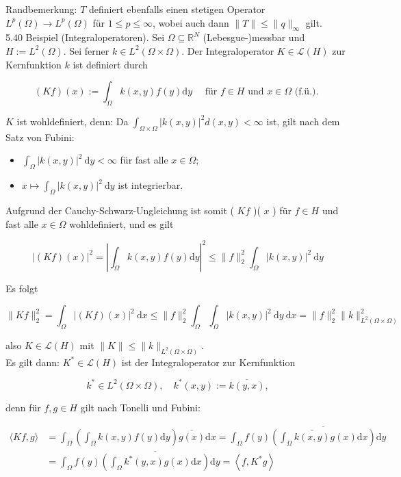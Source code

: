 \documentclass[10pt, letterpaper]{article}
\begin{document}
Randbemerkung: $T$ definiert ebenfalls einen stetigen Operator $L^{p}(\Omega) \rightarrow L^{p}(\Omega)$ für $1 \leq p \leq \infty$, wobei auch dann $\|T\| \leq\|q\|_{\infty}$ gilt.\\
5.40 Beispiel (Integraloperatoren). Sei $\Omega \subseteq \mathbb{R}^{N}$ (Lebesgue-)messbar und $H:=L^{2}(\Omega)$. Sei ferner $k \in L^{2}(\Omega \times \Omega)$. Der Integraloperator $K \in \mathcal{L}(H)$ zur Kernfunktion $k$ ist definiert durch

$$
(K f)(x):=\int_{\Omega} k(x, y) f(y) \mathrm{d} y \quad \text { für } f \in H \text { und } x \in \Omega \text { (f.ü.). }
$$

$K$ ist wohldefiniert, denn: Da $\int_{\Omega \times \Omega}|k(x, y)|^{2} d(x, y)<\infty$ ist, gilt nach dem Satz von Fubini:

\begin{itemize}
  \item $\int_{\Omega}|k(x, y)|^{2} \mathrm{~d} y<\infty$ für fast alle $x \in \Omega$;
  \item $x \mapsto \int_{\Omega}|k(x, y)|^{2} \mathrm{~d} y$ ist integrierbar.
\end{itemize}

Aufgrund der Cauchy-Schwarz-Ungleichung ist somit ( $K f$ )( $x$ ) für $f \in H$ und fast alle $x \in \Omega$ wohldefiniert, und es gilt

$$
|(K f)(x)|^{2}=\left|\int_{\Omega} k(x, y) f(y) \mathrm{d} y\right|^{2} \leq\|f\|_{2}^{2} \int_{\Omega}|k(x, y)|^{2} \mathrm{~d} y
$$

Es folgt

$$
\|K f\|_{2}^{2}=\int_{\Omega}|(K f)(x)|^{2} \mathrm{~d} x \leq\|f\|_{2}^{2} \int_{\Omega} \int_{\Omega}|k(x, y)|^{2} \mathrm{~d} y \mathrm{~d} x=\|f\|_{2}^{2}\|k\|_{L^{2}(\Omega \times \Omega)}^{2}
$$

also $K \in \mathcal{L}(H)$ mit $\|K\| \leq\|k\|_{L^{2}(\Omega \times \Omega)}$.\\
Es gilt dann: $K^{*} \in \mathcal{L}(H)$ ist der Integraloperator zur Kernfunktion

$$
k^{*} \in L^{2}(\Omega \times \Omega), \quad k^{*}(x, y):=\overline{k(y, x)},
$$

denn für $f, g \in H$ gilt nach Tonelli und Fubini:

$$
\begin{aligned}
\langle K f, g\rangle & =\int_{\Omega}\left(\int_{\Omega} k(x, y) f(y) \mathrm{d} y\right) \overline{g(x)} \mathrm{d} x=\int_{\Omega} f(y) \overline{\left(\int_{\Omega} \overline{k(x, y)} g(x) \mathrm{d} x\right)} \mathrm{d} y \\
& =\int_{\Omega} f(y) \overline{\left(\int_{\Omega} k^{*}(y, x) g(x) \mathrm{d} x\right)} \mathrm{d} y=\left\langle f, K^{*} g\right\rangle
\end{aligned}
$$
\end{document}
